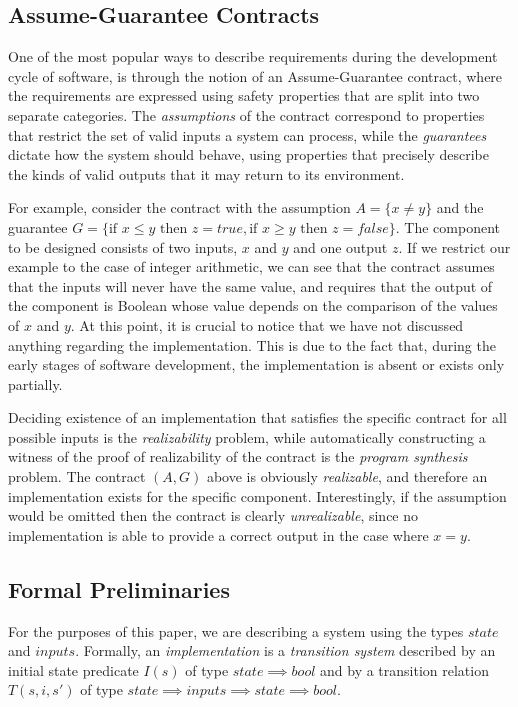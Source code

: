 \subsection{Assume-Guarantee Contracts}

One of the most popular ways to describe requirements during the development
cycle of software, is through the notion of an Assume-Guarantee contract, where
the requirements are expressed using safety properties that are split into two separate categories. The
\emph{assumptions} of the contract correspond to properties that restrict the
set of valid inputs a system can process, while the \emph{guarantees} dictate
how the system should behave, using properties that precisely describe
the kinds of valid outputs that it may return to its environment.

For example, consider the contract with the assumption $A = \{x\neq
y\}$ and the guarantee $G = \{\text{if } x \leq y \text{ then } z =
\textit{true}, \text{if } x \geq y \text{ then } z =
\textit{false}\}$. The component to be designed consists of two
inputs, $x$ and $y$ and one output $z$. If we restrict our example to
the case of integer arithmetic, we can see that the contract assumes
that the inputs will never have the same value, and requires that the
output of the component is Boolean whose value depends on the
comparison of the values of $x$ and $y$. At this point, it is crucial
to notice that we have not discussed anything regarding the
implementation. This is due to the fact that, during the early stages
of software development, the implementation is absent or exists only
partially.

Deciding existence of an implementation that satisfies the specific
contract for all possible inputs is the \emph{realizability} problem,
while automatically constructing a witness of the proof of
realizability of the contract is the \emph{program synthesis} problem.
The contract $(A,G)$ above is obviously \emph{realizable}, and
therefore an implementation exists for the specific component.
Interestingly, if the assumption would be omitted then the contract is
clearly \emph{unrealizable}, since no implementation is able to
provide a correct output in the case where $x=y$.

\subsection{Formal Preliminaries}
\label{sec:pre}

For the purposes of this paper, we are describing a system using the
types $state$ and $inputs$. Formally, an \emph{implementation} is a
\emph{transition system} described by an initial state predicate
$I(s)$ of type $state \implies bool$ and by a transition relation
$T(s,i,s')$ of type $state \implies inputs \implies state \implies
bool$.
 
